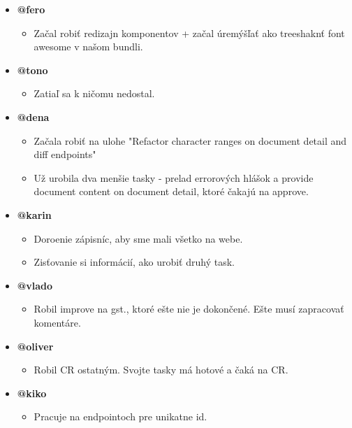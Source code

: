 \documentclass{article}
\begin{document}
    \begin{itemize}
        \item \textbf {@fero}
        \begin{itemize}
            \item Začal robiť redizajn komponentov + začal úremýšľať ako treeshaknť font awesome v našom bundli. 
        \end{itemize}
        \item \textbf {@tono}
        \begin{itemize}
            \item Zatiaľ sa k ničomu nedostal. 
        \end{itemize}
        \item \textbf {@dena}
        \begin{itemize}
            \item Začala robiť na ulohe "Refactor character ranges on document detail and diff endpoints"
            \item Už urobila dva menšie tasky - prelad errorových hlášok a provide document content on document detail, ktoré čakajú na approve. 
        \end{itemize}
        \item \textbf {@karin}
        \begin{itemize}
            \item Doroenie zápisníc, aby sme mali všetko na webe. 
            \item Zisťovanie si informácií, ako urobiť druhý task. 
        \end{itemize}
        \item \textbf {@vlado}
        \begin{itemize}
            \item Robil improve na gst., ktoré ešte nie je dokončené. Ešte musí zapracovať komentáre. 
        \end{itemize}
        \item \textbf {@oliver}
        \begin{itemize}
            \item Robil CR ostatným. Svojte tasky má hotové a čaká na CR. 
        \end{itemize}
        \item \textbf {@kiko}
        \begin{itemize}
            \item Pracuje na endpointoch pre unikatne id. 
        \end{itemize}
    \end{itemize}    
\end{document}
